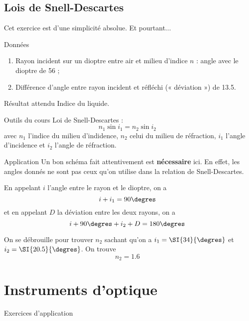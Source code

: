 \documentclass[10pt,notitlepage]{book}
\begin{document}
\section{Lois de Snell-Descartes}
Cet exercice est d'une simplicité absolue. Et pourtant...
\begin{NCdefi}{Données}
    \begin{enumerate}
        \item Rayon incident sur un dioptre entre air et milieu d'indice $n$ :
            angle {\huge avec le dioptre} de \SI{56}{\degres} ;
        \item Différence d'angle entre rayon incident et réfléchi (« déviation
            ») de \SI{13.5}{\degres}.
    \end{enumerate}
\end{NCdefi}

\begin{NCprop}{Résultat attendu}
    Indice du liquide.
\end{NCprop}

\begin{NCdemo}{Outils du cours}
    Loi de Snell-Descartes :
    \[ n_1\sin i_1 = n_2 \sin i_2 \]
    avec $n_1$ l'indice du milieu d'indidence, $n_2$ celui du milieu de
    réfraction, $i_1$ l'angle d'incidence et $i_2$ l'angle de réfraction.
\end{NCdemo}

\begin{NCexem}{Application}
    Un bon schéma fait attentivement est \textbf{nécessaire} ici. En effet,
    les angles donnés ne sont pas ceux qu'on utilise dans la relation de
    Snell-Descartes. \bigbreak
    
    En appelant $i$ l'angle entre le rayon et le dioptre, on a
    \[ i + i_1 = 90\degres\]
    et en appelant $D$ la déviation entre les deux rayons, on a
    \[ i + 90\degres + i_2 + D = 180\degres\]

    On se débrouille pour trouver $n_2$ sachant qu'on a $i_1 = \SI{34}{\degres}$
    et $i_2 = \SI{20.5}{\degres}$. On trouve
    \[ \boxed{n_2 = 1.6} \]
\end{NCexem}

\chapter{Instruments d'optique}
\vspace*{-47pt}
\begin{center}
    \Huge Exercices d'application
\end{center}
\end{document}
